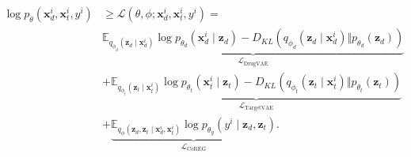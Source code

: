 \begin{equation}
\begin{aligned}
\log p_{\theta}(\mathbf{x}_{d}^{i},\mathbf{x}_{t}^{i},y^{i})
&\geq \mathcal{L}(\theta,\phi;\mathbf{x}_{d}^{i},\mathbf{x}_{t}^{i},y^{i}) =\\
&\underbrace{
\mathbb{E}_{q_{\phi_d}(\mathbf{z}_{d}\mid\mathbf{x}_{d}^{i})}
\log p_{\theta_d}(\mathbf{x}_{d}^{i}\mid\mathbf{z}_{d})
-D_{KL}\!\left(q_{\phi_d}(\mathbf{z}_{d}\mid\mathbf{x}_{d}^{i})
\Vert p_{\theta_d}(\mathbf{z}_{d})\right)
}_{\mathcal{L}_{\mathrm{DrugVAE}}}\\
&+\underbrace{
\mathbb{E}_{q_{\phi_t}(\mathbf{z}_{t}\mid\mathbf{x}_{t}^{i})}
\log p_{\theta_t}(\mathbf{x}_{t}^{i}\mid\mathbf{z}_{t})
-D_{KL}\!\left(q_{\phi_t}(\mathbf{z}_{t}\mid\mathbf{x}_{t}^{i})
\Vert p_{\theta_t}(\mathbf{z}_{t})\right)
}_{\mathcal{L}_{\mathrm{TargetVAE}}}\\
&+\underbrace{
\mathbb{E}_{q_{\phi}(\mathbf{z}_{d},\mathbf{z}_{t}
\mid\mathbf{x}_{d}^{i},\mathbf{x}_{t}^{i})}
\log p_{\theta_y}(y^{i}\mid\mathbf{z}_{d},\mathbf{z}_{t})
}_{\mathcal{L}_{\mathrm{CoREG}}}.
\end{aligned}
\tag{5}
\end{equation}

